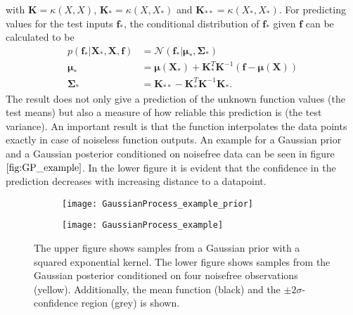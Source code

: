 \documentclass[../main.tex]{subfiles}
\begin{document}
with $\mathbf{K} = \kappa(X,X)$, $\mathbf{K_*} = \kappa(X,X_*)$ and $\mathbf{K_{**}} = \kappa(X_*,X_*)$. For predicting values for the test inputs $\mathbf{f}_*$, the conditional distribution of $\mathbf{f}_*$ given $\mathbf{f}$ can be calculated to be
\begin{align}
    p(\mathbf{f}_*|\mathbf{X}_*,\mathbf{X},\mathbf{f}) &= \mathcal{N}(\mathbf{f}_*|\boldsymbol{\mu}_*,\boldsymbol{\Sigma}_*)\\
    \boldsymbol{\mu}_* &= \boldsymbol{\mu}(\mathbf{X}_*)+\mathbf{K}^T_*\mathbf{K}^{-1}(\mathbf{f}-\boldsymbol{\mu}(\mathbf{X}))\\
    \boldsymbol{\Sigma}_* &= \mathbf{K}_{**} - \mathbf{K}^T_*\mathbf{K}^{-1}\mathbf{K}_*.
\end{align}
The result does not only give a prediction of the unknown function values (the test means) but also a measure of how reliable this prediction is (the test variance). An important result is that the function interpolates the data points exactly in case of noiseless function outputs. An example for a Gaussian prior and a Gaussian posterior conditioned on noisefree data can be seen in figure $\ref{fig:GP_example}$. In the lower figure it is evident that the confidence in the prediction decreases with increasing distance to a datapoint.\par

\begin{figure}
    \centering
    \begin{subfigure}[b]{\textwidth}
    \texttt{[image: GaussianProcess\_example\_prior]}
    \end{subfigure}
    
    \begin{subfigure}[b]{\textwidth}
    \texttt{[image: GaussianProcess\_example]}
    \end{subfigure}
    \caption{The upper figure shows samples from a Gaussian prior with a squared exponential kernel. The lower figure shows samples from the Gaussian posterior conditioned on four noisefree observations (yellow). Additionally, the mean function (black) and the $\pm 2 \sigma$-confidence region (grey) is shown.}    
    \label{fig:GP_example}
\end{figure}
\end{document}
